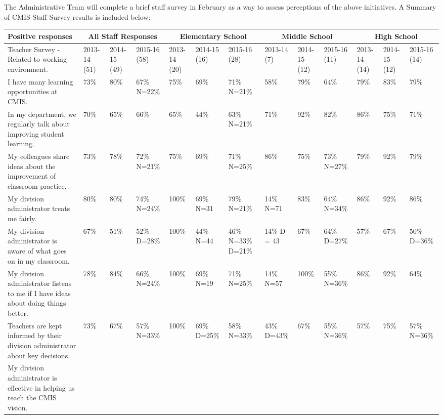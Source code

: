 The Administrative Team will complete a brief staff survey in February as a way to assess perceptions of the above initiatives.  A Summary of CMIS Staff Survey results is included below:  

\begin{table}[!htbp]
\centering
\begin{tabular}{|p{2in}|p{1cm}|p{1cm}|p{1cm}|p{1cm}|p{1cm}|p{1cm}|p{1cm}|p{1cm}|p{1cm}|p{1cm}|p{1cm}|p{1cm}|}
\hline
Positive responses &
\multicolumn{3}{c}{All Staff Responses} &
\multicolumn{3}{c}{Elementary School} &
\multicolumn{3}{c}{Middle School} &
\multicolumn{3}{c}{High School} %
 \\
\toprule
Teacher Survey - Related to working environment.  &
2013-14 (51) &
2014-15 (49) &
2015-16 (58) &
2013-14 (20) &
2014-15 (16) &
2015-16 (28) &
2013-14 (7) &
2014-15 (12) &
2015-16 (11) &
2013-14 (14) &
2014-15 (12) &
2015-16 (14) \\
\hline
I have many learning opportunities at CMIS. &
73\% &
80\% &
67\% N=22\% &
75\% &
69\% &
71\% N=21\% &
58\% &
79\% &
64\% &
79\% &
83\% &
79\% \\
\hline
In my department, we regularly talk about improving student learning.  &
70\% &
65\% &
66\% &
65\% &
44\% &
63\% N=21\% &
71\% &
92\% &
82\% &
86\% &
75\% &
71\% \\
\hline
My colleagues share ideas about the improvement of classroom practice. &
73\% &
78\% &
72\% N=21\% &
75\% &
69\% &
71\% N=25\% &
86\% &
75\% &
73\% N=27\% &
79\% &
92\% &
79\% \\
\hline
My division administrator treats me fairly. &
80\% &
80\% &
74\% N=24\% &
100\% &
69\% N=31 &
79\% N=21\% &
14\% N=71 &
83\% &
64\% N=34\% &
86\% &
92\% &
86\% \\
\hline
My division administrator is aware of what goes on in my classroom. &
67\% &
51\% &
52\% D=28\% &
100\% &
44\% N=44 &
46\% N=33\% D=21\% &
14\% D = 43 &
67\% &
64\% D=27\% &
57\% &
67\% &
50\% D=36\% \\
\hline
My division administrator listens to me if I have ideas about doing things better. &
78\% &
84\% &
66\% N=24\% &
100\% &
69\% N=19 &
71\% N=25\% &
14\% N=57 &
100\% &
55\% N=36\% &
86\% &
92\% &
64\% \\
\hline
Teachers are kept informed by their division administrator about key decisions.  &
73\% &
67\% &
57\% N=33\% &
100\% &
69\% D=25\% &
58\% N=33\% &
43\% D=43\% &
67\% &
55\% N=36\% &
57\% &
75\% &
57\% N=36\% \\
\hline
My division administrator is effective in helping us reach the CMIS vision. 	 &

\end{tabular}
\end{table}
